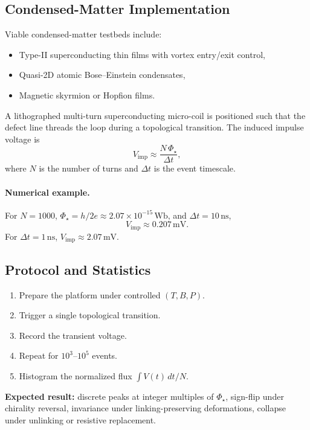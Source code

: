\documentclass[11pt]{article}
\begin{document}
    \subsection{Condensed-Matter Implementation}
    Viable condensed-matter testbeds include:
    \begin{itemize}
        \item Type-II superconducting thin films with vortex entry/exit control,
        \item Quasi-2D atomic Bose–Einstein condensates,
        \item Magnetic skyrmion or Hopfion films.
    \end{itemize}
    A lithographed multi-turn superconducting micro-coil is positioned such that the defect line threads the
    loop during a topological transition. The induced impulse voltage is
    \begin{equation}
    V_{\text{imp}} \approx \frac{N \,\Phi_\star}{\Delta t},
    \end{equation}
    where $N$ is the number of turns and $\Delta t$ is the event timescale.

    \paragraph*{Numerical example.}
    For $N=1000$, $\Phi_\star = h/2e \approx 2.07\times10^{-15}\,\mathrm{Wb}$, and $\Delta t=10\,\mathrm{ns}$,
    \[
    V_{\mathrm{imp}} \approx 0.207\,\mathrm{mV}.
    \]
    For $\Delta t=1\,\mathrm{ns}$, $V_{\mathrm{imp}} \approx 2.07\,\mathrm{mV}$.

    \subsection{Protocol and Statistics}
    \begin{enumerate}
        \item Prepare the platform under controlled $(T,B,P)$.
        \item Trigger a single topological transition.
        \item Record the transient voltage.
        \item Repeat for $10^3$–$10^5$ events.
        \item Histogram the normalized flux $\int V(t)\,dt / N$.
    \end{enumerate}
    \textbf{Expected result:} discrete peaks at integer multiples of $\Phi_\star$, sign-flip under chirality
    reversal, invariance under linking-preserving deformations, collapse under unlinking or resistive replacement.
\end{document}
